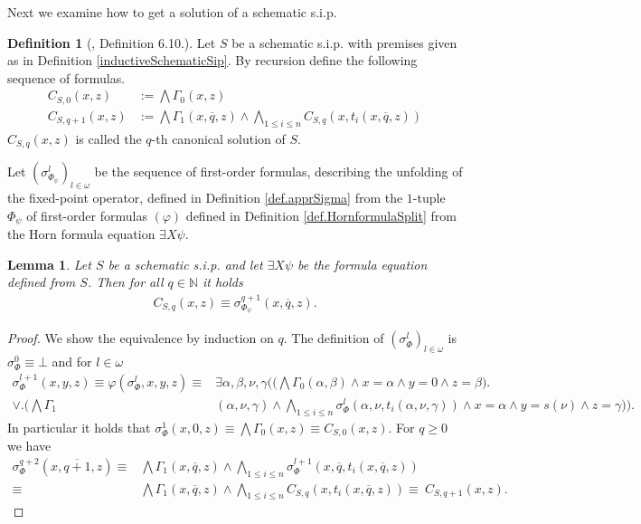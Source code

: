 \documentclass[acmsmall]{acmart}
\theoremstyle{plain}
\newtheorem{lemma}[theorem]{Lemma}
\theoremstyle{definition}
\newtheorem{definition}[theorem]{Definition}
\newcommand{\mybar}[1]{\overline{#1}}
\newcommand{\Nat}{\mathbb{N}}
\begin{document}
Next we examine how to get a solution of a schematic s.i.p.


\begin{definition}[\cite{Eberhard15Inductive}, Definition 6.10.]\label{inductiveSchematicSequence}
	Let $S$ be a schematic s.i.p. with premises given as in Definition \ref{inductiveSchematicSip}. By recursion define the following sequence of formulas.
	\begin{align*}
		C_{S,0}(x,z) &:= \bigwedge \Gamma_0(x,z) \\
		C_{S,q+1}(x,z) &:= \bigwedge \Gamma_1(x,\mybar{q},z) \wedge \bigwedge_{1 \leq i \leq n} C_{S,q}(x,t_i(x,\mybar{q},z))
	\end{align*} 
	$C_{S,q}(x,z)$ is called the $q$-th canonical solution of $S$.
\end{definition}

Let $(\sigma_{\Phi_\psi}^l)_{l \in \omega}$  be the sequence of first-order formulas, describing the unfolding of the fixed-point operator, defined in Definition \ref{def.apprSigma} from the $1$-tuple $\Phi_{\psi}$ of first-order formulas $(\varphi)$ defined in Definition \ref{def.HornformulaSplit} from the Horn formula equation $\exists X \psi$.

\begin{lemma}\label{inductiveEquivalenceVarphi}
	Let $S$ be a schematic s.i.p. and let $\exists X \psi$ be the formula equation defined from $S$. Then for all $q \in \Nat$ it holds 
	\begin{align*}
		C_{S,q}(x,z) \equiv \sigma_{\Phi_{\psi}}^{q+1}(x,\mybar{q},z).
	\end{align*}
\end{lemma}
\begin{proof}
	We show the equivalence by induction on $q$.
	The definition of $(\sigma_{\Phi}^l)_{l \in \omega}$ is $\sigma_{\Phi}^0 \equiv \bot$ and for $l \in \omega$
	\begin{align*}
		\sigma_{\Phi}^{l+1}(x,y,z) \equiv \varphi(\sigma_{\Phi}^l,x,y,z) \equiv& \exists \alpha,\beta, \nu, \gamma \bigg(\Big( \bigwedge \Gamma_0(\alpha,\beta) \wedge x = \alpha \wedge y = 0 \wedge z = \beta\Big)\bigg. \\
		\vee \big.\Big(\bigwedge \Gamma_1&(\alpha,\nu,\gamma) \wedge \bigwedge_{1 \leq i \leq n} \sigma_{\Phi}^l(\alpha,\nu,t_i(\alpha,\nu,\gamma)) \wedge x = \alpha \wedge y = s(\nu) \wedge z = \gamma\Big)\bigg).
	\end{align*}
	In particular it holds that $\sigma_{\Phi}^1(x,0,z) \equiv \bigwedge \Gamma_0(x,z) \equiv  C_{S,0}(x,z)$. For $q \geq 0$ we have 
	\begin{align*}
		\sigma_{\Phi}^{q+2}(x,\mybar{q+1},z) \equiv& \bigwedge \Gamma_1(x,\mybar{q},z) \wedge \bigwedge_{1 \leq i \leq n} \sigma_{\Phi}^{l+1}(x,\mybar{q},t_i(x,\mybar{q},z))\\
		\equiv&  \bigwedge \Gamma_1(x,\mybar{q},z) \wedge \bigwedge_{1 \leq i \leq n} C_{S,q}(x,t_i(x,\mybar{q},z)) \equiv~ C_{S,q+1}(x,z).
	\end{align*}		
\end{proof}
\end{document}
